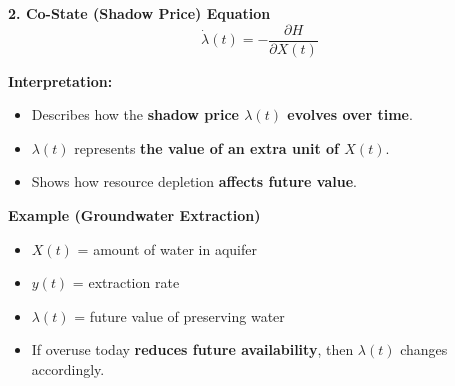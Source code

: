 \documentclass[
  ignorenonframetext,
]{beamer}
\providecommand{\tightlist}{%
  \setlength{\itemsep}{0pt}\setlength{\parskip}{0pt}}\usepackage{longtable,booktabs,array}
\begin{document}
\begin{frame}
\begin{block}{\textbf{2. Co-State (Shadow Price) Equation}}
\label{co-state-shadow-price-equation}
\[\dot{\lambda}(t)=-\frac{\partial H}{\partial X(t)}\]

\begin{block}{\textbf{Interpretation:}}
\label{interpretation-1}
\begin{itemize}
\tightlist
\item
  Describes how the \textbf{shadow price \(\lambda(t)\) evolves over
  time}.\\
\item
  \(\lambda(t)\) represents \textbf{the value of an extra unit of
  \(X(t)\)}.\\
\item
  Shows how resource depletion \textbf{affects future value}.
\end{itemize}
\end{block}

\begin{block}{\textbf{Example (Groundwater Extraction)}}
\label{example-groundwater-extraction}
\begin{itemize}
\tightlist
\item
  \(X(t)\) = amount of water in aquifer\\
\item
  \(y(t)\) = extraction rate\\
\item
  \(\lambda(t)\) = future value of preserving water\\
\item
  If overuse today \textbf{reduces future availability}, then
  \(\lambda(t)\) changes accordingly.
\end{itemize}
\end{block}
\end{block}
\end{frame}
\end{document}
